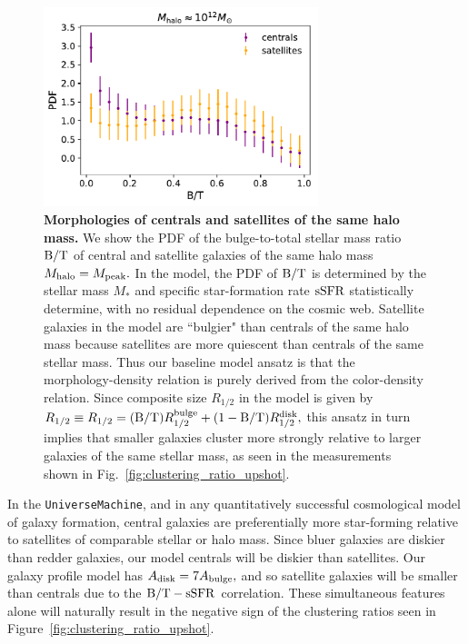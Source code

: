 \documentclass[usenatbib,usegraphicx,letterpaper]{mn2e}
\newcommand{\rhalf}{R_{1/2}}
\newcommand{\rhalfdisk}{R_{1/2}^{\rm disk}}
\newcommand{\rhalfbulge}{R_{1/2}^{\rm bulge}}
\newcommand{\adisk}{A_{\rm disk}}
\newcommand{\abulge}{A_{\rm bulge}}
\newcommand{\bt}{{\rm B/T}}
\newcommand{\mstar}{M_{\ast}}
\newcommand{\ssfr}{{\rm sSFR}}
\newcommand{\mpeak}{M_{\rm peak}}
\newcommand{\mhalo}{M_{\rm halo}}
\begin{document}
\begin{figure}
\centering
\includegraphics[width=8cm]{FIGS/random_bt_centrals_vs_satellites.pdf}
\caption{
{\bf Morphologies of centrals and satellites of the same halo mass.} We show the PDF of the bulge-to-total stellar mass ratio $\bt$ of central and satellite galaxies of the same halo mass $\mhalo=\mpeak.$ In the model, the PDF of $\bt$ is determined by the stellar mass $\mstar$ and specific star-formation rate $\ssfr$ statistically determine, with no residual dependence on the cosmic web. Satellite galaxies in the model are ``bulgier" than centrals of the same halo mass because satellites are more quiescent than centrals of the same stellar mass. Thus our baseline model ansatz is that the morphology-density relation is purely derived from the color-density relation. Since composite size $\rhalf$ in the model is given by $\rhalf\equiv\rhalf=(\bt)\rhalfbulge + (1-\bt)\rhalfdisk,$ this ansatz in turn implies that smaller galaxies cluster more strongly relative to larger galaxies of the same stellar mass, as seen in the measurements shown in Fig.~\ref{fig:clustering_ratio_upshot}.
}
\label{fig:bt_censat}
\end{figure}

In the {\tt UniverseMachine}, and in any quantitatively successful cosmological model of galaxy formation, central galaxies are preferentially more star-forming relative to satellites of comparable stellar or halo mass. Since bluer galaxies are diskier than redder galaxies, our model centrals will be diskier than satellites. Our galaxy profile model has $\adisk=7\abulge,$ and so satellite galaxies will be smaller than centrals due to the $\bt-\ssfr$ correlation. These simultaneous features alone will naturally result in the negative sign of the clustering ratios seen in Figure~\ref{fig:clustering_ratio_upshot}.
\end{document}
